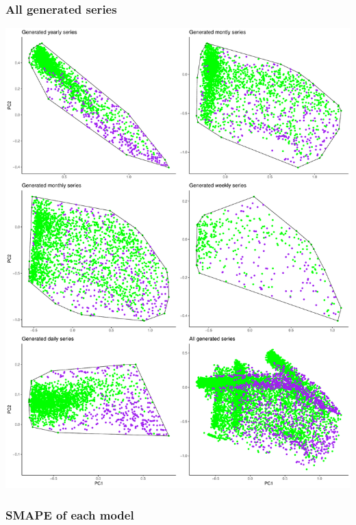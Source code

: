 \begin{frame}
\frametitle{All generated series}

\begin{center}
\includegraphics[width = 0.5\linewidth]{slides/all_gen.pdf}
\end{center}
\end{frame}


\begin{frame}
\frametitle{SMAPE of each model}

\begin{figure}
\end{figure}
\end{frame}



